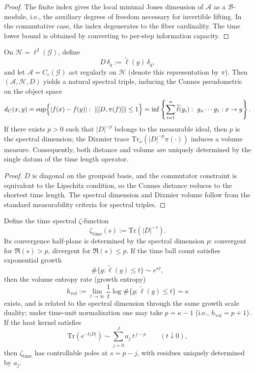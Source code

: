 \begin{proof}
The finite index gives the local minimal Jones dimension of \(\mathcal A\) as a \(\mathcal B\)-module, i.e., the auxiliary degrees of freedom necessary for invertible lifting.
In the commutative case, the index degenerates to the fiber cardinality.
The time lower bound is obtained by converting to per-step information capacity.
\end{proof}

\begin{theorem}\label{thm:xi-time-spectral-triple-distance-volume}
On \(\mathcal H=\ell^2(\mathcal G)\), define
\[
D\,\delta_g:=\widetilde\ell(g)\,\delta_g,
\]
and let \(\mathcal A=C_c(\mathcal G)\) act regularly on \(\mathcal H\) (denote this representation by \(\pi\)).
Then \((\mathcal A,\mathcal H,D)\) yields a natural spectral triple, inducing the Connes pseudometric on the object space
\[
d_C(x,y)
=
\sup\Bigl\{|f(x)-f(y)|:\ \|[D,\pi(f)]\|\le 1\Bigr\}
=
\inf\left\{
\sum_{i=1}^n\widetilde\ell(g_i):\ g_n\cdots g_1:x\to y
\right\}.
\]
If there exists \(p>0\) such that \(|D|^{-p}\) belongs to the measurable ideal, then \(p\) is the spectral dimension; the Dixmier trace
\(
\mathrm{Tr}_\omega(|D|^{-p}\pi(\cdot))
\)
induces a volume measure.
Consequently, both distance and volume are uniquely determined by the single datum of the time length operator.
\end{theorem}

\begin{proof}
\(D\) is diagonal on the groupoid basis, and the commutator constraint is equivalent to the Lipschitz condition, so the Connes distance reduces to the shortest time length.
The spectral dimension and Dixmier volume follow from the standard measurability criteria for spectral triples.
\end{proof}

\begin{theorem}\label{thm:xi-time-zeta-singularity-from-growth}
Define the time spectral \(\zeta\)-function
\[
\zeta_{\mathrm{time}}(s):=\mathrm{Tr}(|D|^{-s}).
\]
Its convergence half-plane is determined by the spectral dimension \(p\): convergent for \(\Re(s)>p\), divergent for \(\Re(s)\le p\).
If the time ball count satisfies exponential growth
\[
\#\{g:\widetilde\ell(g)\le t\}\sim e^{\kappa t},
\]
then the volume entropy rate (growth entropy)
\[
h_{\mathrm{vol}}
:=\lim_{t\to\infty}\frac{1}{t}\log \#\{g:\widetilde\ell(g)\le t\}
=\kappa
\]
exists, and is related to the spectral dimension through the same growth scale duality; under time-unit normalization one may take \(p=\kappa-1\) (i.e., \(h_{\mathrm{vol}}=p+1\)).
If the heat kernel satisfies
\[
\mathrm{Tr}(e^{-t|D|})
\sim
\sum_{j=0}^{J}a_j\,t^{\,j-p}
\qquad(t\downarrow 0),
\]
then \(\zeta_{\mathrm{time}}\) has controllable poles at \(s=p-j\), with residues uniquely determined by \(a_j\).
\end{theorem}

